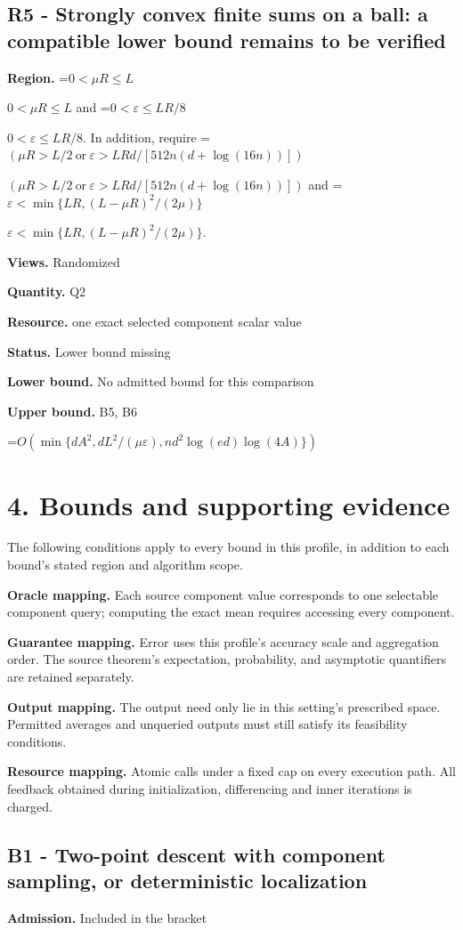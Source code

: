 \documentclass[10pt,a4paper]{article}
\newcommand{\AtlasMath}[1]{\par\begingroup\centering\setbox0=\hbox{$\displaystyle #1$}\ifdim\wd0>1.4\linewidth\typeout{ATLAS WIDE FORMULA: \the\wd0}\fi\ifdim\wd0>\linewidth\resizebox{\linewidth}{!}{\box0}\else\box0\fi\par\endgroup}
\newcommand{\AtlasInlineMath}[1]{\begingroup\setbox0=\hbox{$#1$}\ifdim\wd0>.4\linewidth\endgroup\AtlasMath{#1}\else\endgroup$#1$\fi}
\begin{document}
\subsection{R5 - Strongly convex finite sums on a ball: a compatible lower bound remains to be verified}
\textbf{Region.} \AtlasInlineMath{0<\mu R\le L} and \AtlasInlineMath{0<\varepsilon\le LR/8}. In addition, require \AtlasInlineMath{(\mu R>L/2\ \text{or}\ \varepsilon>LRd/[512n(d+\log(16n))])} and \AtlasInlineMath{\varepsilon<\min\{LR,(L-\mu R)^2/(2\mu)\}}.

\textbf{Views.} Randomized

\textbf{Quantity.} Q2

\textbf{Resource.} one exact selected component scalar value

\textbf{Status.} Lower bound missing

\textbf{Lower bound.} No admitted bound for this comparison

\textbf{Upper bound.} B5, B6

\AtlasMath{O(\min\{dA^2,dL^2/(\mu\varepsilon),nd^2\log(ed)\log(4A)\})}
\section{4. Bounds and supporting evidence}
The following conditions apply to every bound in this profile, in addition to each bound's stated region and algorithm scope.

\textbf{Oracle mapping.} Each source component value corresponds to one selectable component query; computing the exact mean requires accessing every component.

\textbf{Guarantee mapping.} Error uses this profile's accuracy scale and aggregation order. The source theorem's expectation, probability, and asymptotic quantifiers are retained separately.

\textbf{Output mapping.} The output need only lie in this setting's prescribed space. Permitted averages and unqueried outputs must still satisfy its feasibility conditions.

\textbf{Resource mapping.} Atomic calls under a fixed cap on every execution path. All feedback obtained during initialization, differencing and inner iterations is charged.

\subsection{B1 - Two-point descent with component sampling, or deterministic localization}
\textbf{Admission.} Included in the bracket
\end{document}
